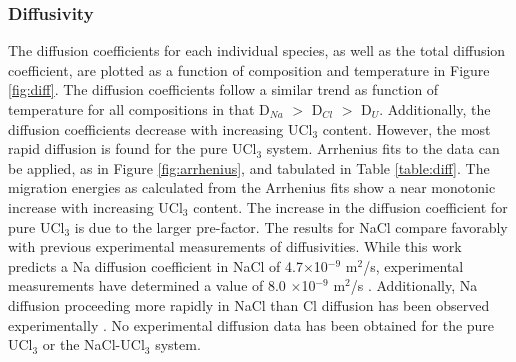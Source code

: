 \documentclass[preprint,3p,10pt,onecolumn,number,sort&compress]{elsarticle}
\begin{document}
{\FloatBarrier

\subsubsection{Diffusivity}

The diffusion coefficients for each individual species, as well as the total diffusion coefficient, are plotted as a function of composition and temperature in Figure \ref{fig:diff}. The diffusion coefficients follow a similar trend as function of temperature for all compositions in that D$_{Na}$ $>$ D$_{Cl}$ $>$ D$_U$. Additionally, the diffusion coefficients decrease with increasing UCl$_3$ content. However, the most rapid diffusion is found for the pure UCl$_3$ system. Arrhenius fits to the data can be applied, as in Figure \ref{fig:arrhenius}, and tabulated in Table \ref{table:diff}. The migration energies as calculated from the Arrhenius fits show a near monotonic increase with increasing UCl$_3$ content. The increase in the diffusion coefficient for pure UCl$_3$ is due to the larger pre-factor. The results for NaCl compare favorably with previous experimental measurements of diffusivities. While this work predicts a Na diffusion coefficient in NaCl of 4.7$\times$10$^{-9}$ m$^2$/s, experimental measurements have determined a value of 8.0 $\times$10$^{-9}$ m$^2$/s \cite{janz_diffusion}. Additionally, Na diffusion proceeding more rapidly in NaCl than Cl diffusion has been observed experimentally \cite{janz_diffusion}. No experimental diffusion data has been obtained for the pure UCl$_3$ or the NaCl-UCl$_3$ system. 

}
\end{document}
